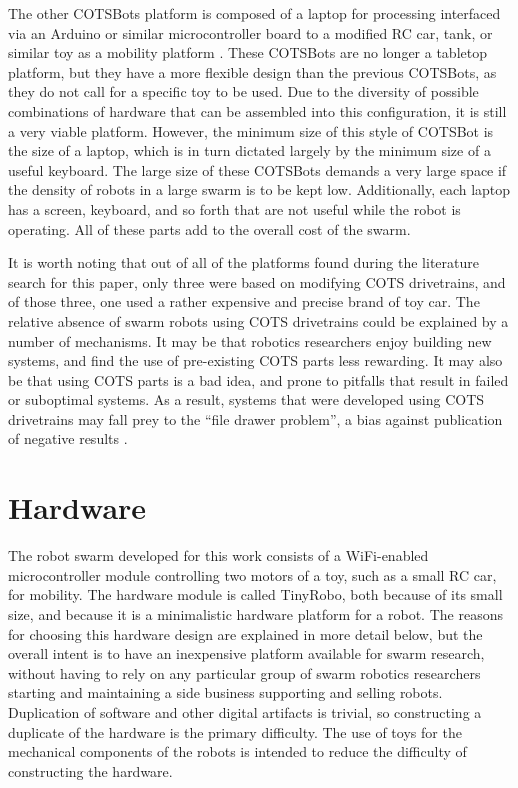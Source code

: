 \documentclass[]{article}
\begin{document}
The other COTSBots platform is composed of a laptop for processing interfaced via an Arduino or similar microcontroller board to a modified RC car, tank, or similar toy as a mobility platform \cite{soule2011cotsbots}.
These COTSBots are no longer a tabletop platform, but they have a more flexible design than the previous COTSBots, as they do not call for a specific toy to be used.
Due to the diversity of possible combinations of hardware that can be assembled into this configuration, it is still a very viable platform. 
However, the minimum size of this style of COTSBot is the size of a laptop, which is in turn dictated largely by the minimum size of a useful keyboard. 
The large size of these COTSBots demands a very large space if the density of robots in a large swarm is to be kept low. 
Additionally, each laptop has a screen, keyboard, and so forth that are not useful while the robot is operating. 
All of these parts add to the overall cost of the swarm. 

It is worth noting that out of all of the platforms found during the literature search for this paper, only three were based on modifying COTS drivetrains, and of those three, one used a rather expensive and precise brand of toy car. 
The relative absence of swarm robots using COTS drivetrains could be explained by a number of mechanisms. 
It may be that robotics researchers enjoy building new systems, and find the use of pre-existing COTS parts less rewarding.
It may also be that using COTS parts is a bad idea, and prone to pitfalls that result in failed or suboptimal systems.
As a result, systems that were developed using COTS drivetrains may fall prey to the ``file drawer problem'', a bias against publication of negative results \cite{file_drawer_prob_10.2307/2684823}.

\section{Hardware}

The robot swarm developed for this work consists of a WiFi-enabled microcontroller module controlling two motors of a toy, such as a small RC car, for mobility. 
The hardware module is called TinyRobo, both because of its small size, and because it is a minimalistic hardware platform for a robot. 
The reasons for choosing this hardware design are explained in more detail below, but the overall intent is to have an inexpensive platform available for swarm research, without having to rely on any particular group of swarm robotics researchers starting and maintaining a side business supporting and selling robots.
Duplication of software and other digital artifacts is trivial, so constructing a duplicate of the hardware is the primary difficulty. 
The use of toys for the mechanical components of the robots is intended to reduce the difficulty of constructing the hardware. 
\end{document}
